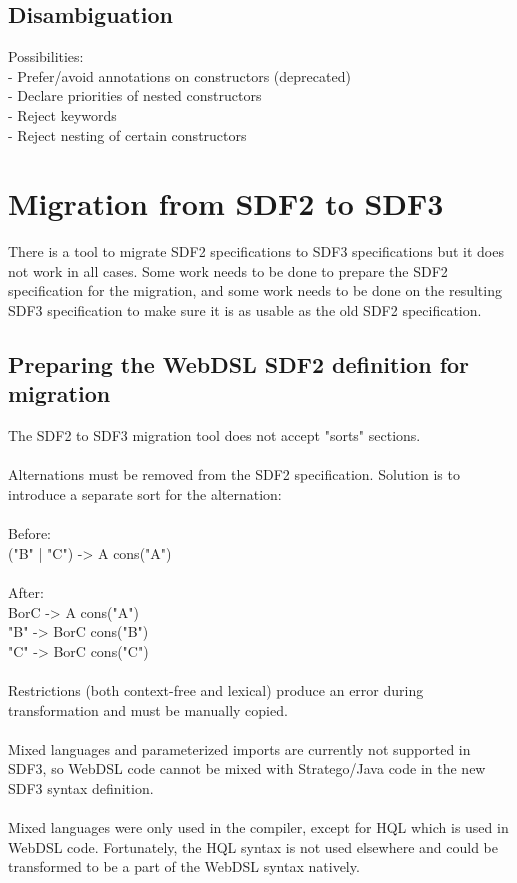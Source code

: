     \subsection{\label{subsec:sdf3-disambiguation}Disambiguation}

      Possibilities:
      \\- Prefer/avoid annotations on constructors (deprecated)
      \\- Declare priorities of nested constructors
      \\- Reject keywords
      \\- Reject nesting of certain constructors

  \section{\label{sec:sdf2-to-sdf3}Migration from SDF2 to SDF3}

    There is a tool to migrate SDF2 specifications to SDF3 specifications but it does not work in all cases. Some work needs to be done to prepare the SDF2 specification for the migration, and some work needs to be done on the resulting SDF3 specification to make sure it is as usable as the old SDF2 specification.

    \subsection{\label{subsec:preparing-webdsl-sdf2}Preparing the WebDSL SDF2 definition for migration}

      The SDF2 to SDF3 migration tool does not accept "sorts" sections.
      \\\\Alternations must be removed from the SDF2 specification. Solution is to introduce a separate sort for the alternation:
      \\\\Before:
      \\("B" | "C") -> A {cons("A")}
      \\\\After:
      \\BorC -> A    {cons("A")}
      \\"B"  -> BorC {cons("B")}
      \\"C"  -> BorC {cons("C")}
      \\\\Restrictions (both context-free and lexical) produce an error during transformation and must be manually copied.
      \\\\Mixed languages and parameterized imports are currently not supported in SDF3, so WebDSL code cannot be mixed with Stratego/Java code in the new SDF3 syntax definition.
      \\\\Mixed languages were only used in the compiler, except for HQL which is used in WebDSL code. Fortunately, the HQL syntax is not used elsewhere and could be transformed to be a part of the WebDSL syntax natively.

